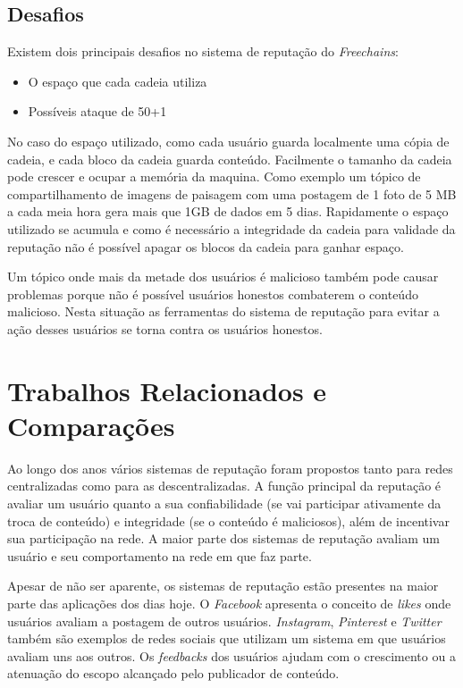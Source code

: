\documentclass[12pt]{article}
\newcommand{\FC} {\emph{Freechains}\xspace}
\begin{document}
\subsection{Desafios} \label{subsec:fraq}


Existem dois principais desafios no sistema de reputação do \FC:

\begin{itemize}
    \item O espaço que cada cadeia utiliza
    \item Possíveis ataque de 50+1%
\end{itemize}

No caso do espaço utilizado, como cada usuário guarda localmente uma cópia de cadeia, e cada bloco da cadeia guarda conteúdo. 
Facilmente o tamanho da cadeia pode crescer e ocupar a memória da maquina. 
Como exemplo um tópico de compartilhamento de imagens de paisagem com uma postagem de 1 foto de 5 MB a cada meia hora gera mais que 1GB de dados em 5 dias. 
Rapidamente o espaço utilizado se acumula e como é necessário a integridade da cadeia para validade da reputação não é possível apagar os blocos da cadeia para ganhar espaço.

Um tópico onde mais da metade dos usuários é malicioso também pode causar problemas porque não é possível usuários honestos combaterem o conteúdo malicioso. 
Nesta situação as ferramentas do sistema de reputação para evitar a ação desses usuários se torna contra os usuários honestos.

\section{Trabalhos Relacionados e Comparações} \label{sec:trabrec}

Ao longo dos anos vários sistemas de reputação foram propostos tanto para redes centralizadas como para as descentralizadas. 
A função principal da reputação é avaliar um usuário quanto a sua confiabilidade (se vai participar ativamente da troca de conteúdo) e integridade (se o conteúdo é maliciosos), além de incentivar sua participação na rede. 
A maior parte dos sistemas de reputação avaliam um usuário e seu comportamento na rede em que faz parte. 

Apesar de não ser aparente, os sistemas de reputação estão presentes na maior parte das aplicações dos dias hoje.
O \emph{Facebook} apresenta o conceito de \emph{likes} onde usuários avaliam a postagem de outros usuários. \emph{Instagram}, \emph{Pinterest} e \emph{Twitter} também são exemplos de redes sociais que utilizam um sistema em que usuários avaliam uns aos outros. 
Os \emph{feedbacks} dos usuários ajudam com o crescimento ou a atenuação do escopo alcançado pelo publicador de conteúdo.  
\end{document}
